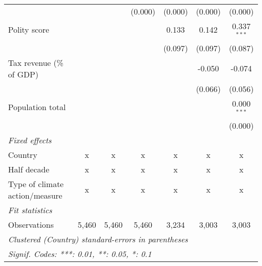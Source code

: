 \begin{tabular}{lcccccc}
                                                                                       &         &         & (0.000)       & (0.000)       & (0.000)       & (0.000)\\   
   Polity score                                                                        &         &         &               & 0.133         & 0.142         & 0.337$^{***}$\\   
                                                                                       &         &         &               & (0.097)       & (0.097)       & (0.087)\\   
   Tax revenue (\% of GDP)                                                             &         &         &               &               & -0.050        & -0.074\\   
                                                                                       &         &         &               &               & (0.066)       & (0.056)\\   
   Population total                                                                    &         &         &               &               &               & 0.000$^{***}$\\   
                                                                                       &         &         &               &               &               & (0.000)\\   
   \emph{Fixed effects}\\
   Country                                                                             & x       & x       & x             & x             & x             & x\\  
   Half decade                                                                         & x       & x       & x             & x             & x             & x\\  
   Type of climate action/measure                                                      & x       & x       & x             & x             & x             & x\\  
   \midrule \emph{Fit statistics}\\
   Observations                                                                        & 5,460   & 5,460   & 5,460         & 3,234         & 3,003         & 3,003\\  
   \midrule
   \multicolumn{7}{l}{\emph{Clustered (Country) standard-errors in parentheses}}\\
   \multicolumn{7}{l}{\emph{Signif. Codes: ***: 0.01, **: 0.05, *: 0.1}}\\
\end{tabular}
\par\endgroup


